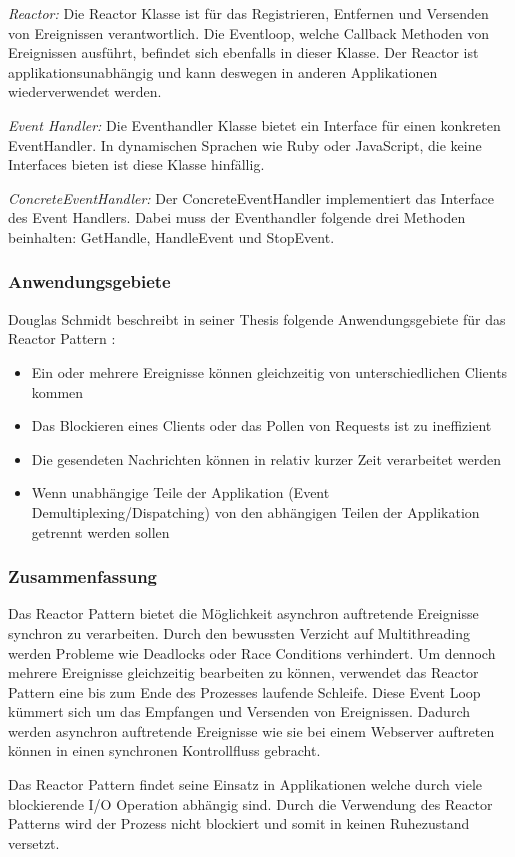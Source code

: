 \cite[p. 2]{Sch95}

\emph{Reactor:}
 Die Reactor Klasse ist für das Registrieren, Entfernen und Versenden von Ereignissen verantwortlich. Die Eventloop, welche Callback Methoden von Ereignissen ausführt, befindet sich ebenfalls in dieser Klasse. Der Reactor ist applikationsunabhängig und kann deswegen in anderen Applikationen wiederverwendet werden. 

\emph{Event Handler:}
Die Eventhandler Klasse bietet ein Interface für einen konkreten EventHandler. In dynamischen Sprachen wie Ruby oder JavaScript, die keine Interfaces bieten ist diese Klasse hinfällig. 

\emph{ConcreteEventHandler:}
Der ConcreteEventHandler implementiert das Interface des Event Handlers. Dabei muss der Eventhandler folgende drei Methoden beinhalten: GetHandle, HandleEvent und StopEvent.

\subsubsection{Anwendungsgebiete}

Douglas Schmidt beschreibt in seiner Thesis folgende Anwendungsgebiete für das Reactor Pattern \cite[p. 4]{Sch95}:

\begin{itemize}
  \item Ein oder mehrere Ereignisse können gleichzeitig von unterschiedlichen Clients kommen
  \item Das Blockieren eines Clients oder das Pollen von Requests ist zu ineffizient
  \item Die gesendeten Nachrichten können in relativ kurzer Zeit verarbeitet werden
  \item Wenn unabhängige Teile der Applikation (Event Demultiplexing/Dispatching) von den abhängigen Teilen der Applikation getrennt werden sollen
\end{itemize}

\subsubsection{Zusammenfassung}

Das Reactor Pattern bietet die Möglichkeit asynchron auftretende Ereignisse synchron zu verarbeiten. Durch den bewussten Verzicht auf Multithreading werden Probleme wie Deadlocks oder Race Conditions verhindert. Um dennoch mehrere Ereignisse gleichzeitig bearbeiten zu können, verwendet das Reactor Pattern eine bis zum Ende des Prozesses laufende Schleife. Diese Event Loop kümmert sich um das Empfangen und Versenden von Ereignissen. Dadurch werden asynchron auftretende Ereignisse wie sie bei einem Webserver auftreten können in einen synchronen Kontrollfluss gebracht. 

Das Reactor Pattern findet seine Einsatz in Applikationen welche durch viele blockierende I/O Operation abhängig sind. Durch die Verwendung des Reactor Patterns wird der Prozess nicht blockiert und somit in keinen Ruhezustand versetzt.